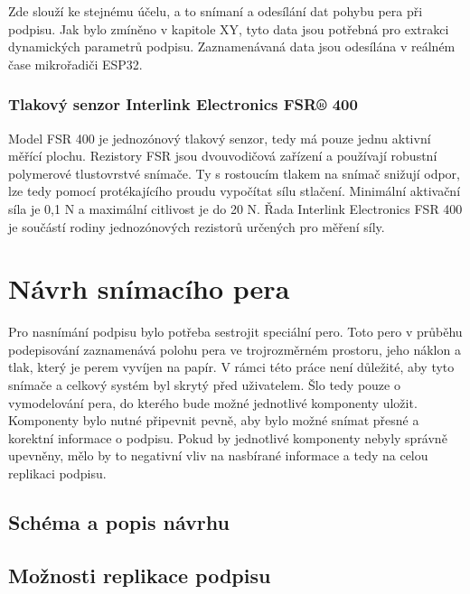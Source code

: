 Zde slouží ke stejnému účelu, a to snímaní a odesílání dat pohybu pera při podpisu.                 %
Jak bylo zmíněno v kapitole XY, tyto data jsou potřebná pro extrakci dynamických parametrů podpisu. %
Zaznamenávaná data jsou odesílána v reálném čase mikrořadiči ESP32.                                 %

\subsection*{Tlakový senzor Interlink Electronics FSR® 400}
Model FSR 400 je jednozónový tlakový senzor, tedy má pouze jednu aktivní měřící plochu.                       %
Rezistory FSR jsou dvouvodičová zařízení a používají robustní polymerové tlustovrstvé snímače.                %
Ty s rostoucím tlakem na snímač snižují odpor, lze tedy pomocí protékajícího proudu vypočítat sílu stlačení.  %
Minimální aktivační síla je 0,1 N a maximální citlivost je do 20 N.                                           %
Řada Interlink Electronics FSR 400 je součástí rodiny jednozónových rezistorů určených pro měření síly.       %


\chapter{Návrh snímacího pera}
Pro nasnímání podpisu bylo potřeba sestrojit speciální pero.                                        %
Toto pero v průběhu podepisování zaznamenává polohu pera ve trojrozměrném prostoru,                 %
jeho náklon a tlak, který je perem vyvíjen na papír.                                                %
V rámci této práce není důležité, aby tyto snímače a celkový systém byl skrytý před uživatelem.     %
Šlo tedy pouze o vymodelování pera, do kterého bude možné jednotlivé komponenty uložit.             %
Komponenty bylo nutné připevnit pevně, aby bylo možné snímat přesné a korektní informace o podpisu. %
Pokud by jednotlivé komponenty nebyly správně upevněny,                                             %
mělo by to negativní vliv na nasbírané informace a tedy na celou replikaci podpisu.                 %
 
\section{Schéma a popis návrhu}


\section{Možnosti replikace podpisu}

